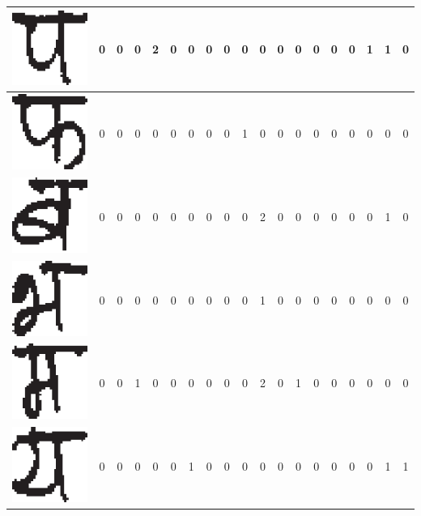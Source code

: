 \begin{table}[h]
\begin{tabular}{|c|c|c|c|c|c|c|c|c|c|c|c|c|c|c|c|c|c|c|}
\hline
\includegraphics[scale=0.25]{figures/datasets/nhcr/consonants/21pa} & 0 & 0 & 0 & 2 & 0 & 0 & 0 & 0 & 0 & 0 & 0 & 0 & 0 & 0 & 0 & 1 & 1 & 0\tabularnewline
\hline
\includegraphics[scale=0.25]{figures/datasets/nhcr/consonants/22pha} & 0 & 0 & 0 & 0 & 0 & 0 & 0 & 0 & 1 & 0 & 0 & 0 & 0 & 0 & 0 & 0 & 0 & 0\tabularnewline
\hline
\includegraphics[scale=0.25]{figures/datasets/nhcr/consonants/23ba} & 0 & 0 & 0 & 0 & 0 & 0 & 0 & 0 & 0 & 2 & 0 & 0 & 0 & 0 & 0 & 0 & 1 & 0\tabularnewline
\hline
\includegraphics[scale=0.25]{figures/datasets/nhcr/consonants/24bha} & 0 & 0 & 0 & 0 & 0 & 0 & 0 & 0 & 0 & 1 & 0 & 0 & 0 & 0 & 0 & 0 & 0 & 0\tabularnewline
\hline
\includegraphics[scale=0.25]{figures/datasets/nhcr/consonants/25ma} & 0 & 0 & 1 & 0 & 0 & 0 & 0 & 0 & 0 & 2 & 0 & 1 & 0 & 0 & 0 & 0 & 0 & 0\tabularnewline
\hline
\includegraphics[scale=0.25]{figures/datasets/nhcr/consonants/26ya} & 0 & 0 & 0 & 0 & 0 & 1 & 0 & 0 & 0 & 0 & 0 & 0 & 0 & 0 & 0 & 0 & 1 & 1\tabularnewline

\end{tabular}
\end{table}
